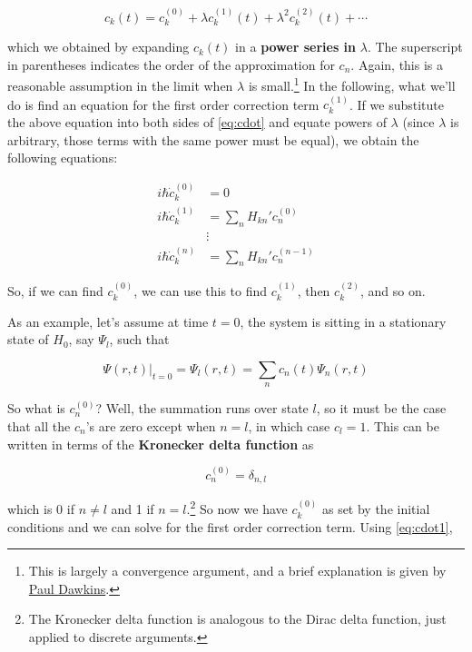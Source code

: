\begin{equation}
	\boxed{c_k(t) = c_k^{(0)} + \lambda c_k^{(1)}(t) + \lambda^2 c_k^{(2)}(t) + \cdots} \label{eq:c-pow}
\end{equation}

\noindent which we obtained by expanding $c_k(t)$ in a \textbf{power series in} $\lambda$. 
The superscript in parentheses indicates the order of the approximation for $c_n$. 
Again, this is a reasonable assumption in the limit when $\lambda$ is small.\footnote{This is largely a convergence argument, and a brief explanation is given by \href{http://tutorial.math.lamar.edu/Classes/CalcII/PowerSeriesandFunctions.aspx}{Paul Dawkins}.} 
In the following, what we'll do is find an equation for the first order correction term $c_k^{(1)}$. 
If we substitute the above equation into both sides of \autoref{eq:cdot} and equate powers of $\lambda$ (since $\lambda$ is arbitrary, those terms with the same power must be equal), we obtain the following equations:

\begin{align}
	i\hbar \dot{c}_k^{(0)} &= 0 \label{eq:cdot0} \\
	i\hbar \dot{c}_k^{(1)} &= \sum_n H_{kn}' c_n^{(0)} \label{eq:cdot1} \\
	&\vdots \nonumber \\
	i\hbar \dot{c}_k^{(n)} &= \sum_n H_{kn}' c_n^{(n-1)} \label{eq:cdotn}
\end{align}

So, if we can find $c_k^{(0)}$, we can use this to find $c_k^{(1)}$, then $c_k^{(2)}$, and so on.

As an example, let's assume at time $t = 0$, the system is sitting in a stationary state of $H_0$, say $\Psi_l$, such that

\begin{equation*}
	\Psi(r,t)|_{t=0} = \Psi_l(r,t) = \sum_n c_n(t) \Psi_n(r,t)
\end{equation*}

So what is $c_n^{(0)}$? 
Well, the summation runs over state $l$, so it must be the case that all the $c_n$'s are zero except when $n = l$, in which case $c_l = 1$. 
This can be written in terms of the \textbf{Kronecker delta function} as

\begin{equation}
	c_n^{(0)} = \delta_{n,l}
\end{equation}

\noindent which is 0 if $n\neq l$ and 1 if $n = l$.\footnote{The Kronecker delta function is analogous to the Dirac delta function, just applied to discrete arguments.} 
So now we have $c_k^{(0)}$ as set by the initial conditions and we can solve for the first order correction term. 
Using \autoref{eq:cdot1}, 

